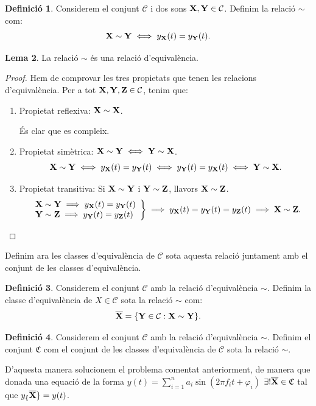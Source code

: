 \documentclass{article}
\theoremstyle{definition}
\newtheorem{definition}{Definició}[section]
\newtheorem{lemma}[definition]{Lema}
\newcommand{\0}{\ensuremath{\vb{0}}}
\newcommand{\X}{\ensuremath{\vb{X}}}
\newcommand{\Y}{\ensuremath{\vb{Y}}}
\newcommand{\Z}{\ensuremath{\vb{Z}}}
\begin{document}
\begin{definition}
    Considerem el conjunt $\mathcal{C}$ i dos sons $\X,\Y\in\mathcal{C}$. Definim la relació $\sim$ com: $$\X\sim \Y\iff y_{\X}(t)=y_{\Y}(t).$$
\end{definition}
\begin{lemma}
    La relació $\sim$ és una relació d'equivalència.
\end{lemma}
\begin{proof}
    Hem de comprovar les tres propietats que tenen les relacions d'equivalència. Per a tot $\X,\Y,\Z\in\mathcal{C}$, tenim que:
    \begin{enumerate}
        \item Propietat reflexiva: $\X\sim \X$.\par És clar que es compleix.
        \item Propietat simètrica: $\X\sim \Y\iff \Y\sim \X$.
        $$\X\sim \Y\iff y_{\X}(t)=y_{\Y}(t)\iff y_{\Y}(t)=y_{\X}(t)\iff \Y\sim \X.$$
        \item Propietat transitiva: Si $\X\sim \Y$ i $\Y\sim \Z$, llavors $\X\sim \Z$.
            $$\left.
            \begin{array}{l}
                \X\sim \Y\implies y_{\X}(t)=y_{\Y}(t)\\
                \Y\sim \Z\implies y_{\Y}(t)=y_{\Z}(t)
            \end{array}\right\}\implies y_{\X}(t)=y_{\Y}(t)=y_{\Z}(t)\implies \X\sim \Z.$$
    \end{enumerate}
\end{proof}
Definim ara les classes d'equivalència de $\mathcal{C}$ sota aquesta relació juntament amb el conjunt de les classes d'equivalència.
\begin{definition}
    Considerem el conjunt $\mathcal{C}$ amb la relació d'equivalència $\sim$. Definim la classe d'equivalència de $X\in\mathcal{C}$ sota la relació $\sim$ com: $$\overline{\X}=\{\Y\in\mathcal{C}:\X\sim \Y\}.$$
\end{definition}
\begin{definition}
    Considerem el conjunt $\mathcal{C}$ amb la relació d'equivalència $\sim$. Definim el conjunt $\mathfrak{C}$ com el conjunt de les classes d'equivalència de $\mathcal{C}$ sota la relació $\sim$.
\end{definition}
D'aquesta manera solucionem el problema comentat anteriorment, de manera que donada una equació de la forma $y(t)=\sum_{i=1}^na_i\sin(2\pi f_it+\varphi_i)$ $\exists!\overline{\X}\in\mathfrak{C}$ tal que $y_\{\overline{\X}\}=y(t)$.\par
\end{document}
